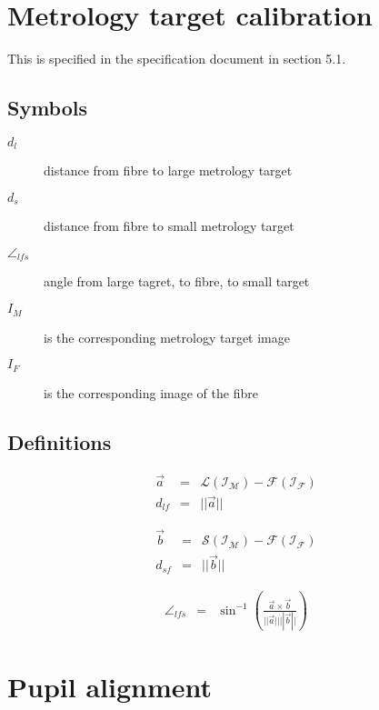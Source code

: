 \documentclass[11pt,a4paper]{scrartcl}
\begin{document}
\section{Metrology target calibration}

This is specified in the specification document in section 5.1.
\subsection{Symbols}

\begin{description}
\item[$d_l$] distance from fibre to large metrology target
\item[$d_s$] distance from fibre to small metrology target
\item[$\angle_{lfs}$] angle from large tagret, to fibre, to small target
\item[$I_M$] is the corresponding metrology target image
\item[$I_F$] is the corresponding image of the fibre
\end{description}

\subsection{Definitions}

\begin{eqnarray}
  \vec{a} & =  & \mathcal{L(I_M)} - \mathcal{F(I_F)} \\
  d_{lf} & = &  ||\vec{a}||
\end{eqnarray}

\begin{eqnarray}
  \vec{b} & = & \mathcal{S(I_M)} - \mathcal{F(I_F)} \\
  d_{sf} & =  & ||\vec{b}||
\end{eqnarray}

\begin{eqnarray}
  \angle_{lfs} & = &  \sin^{-1}( \frac{\vec{a} \times \vec{b}}{||\vec{a}|| \dot ||\vec{b}||} )
\end{eqnarray}


\section{Pupil alignment}
\end{document}
